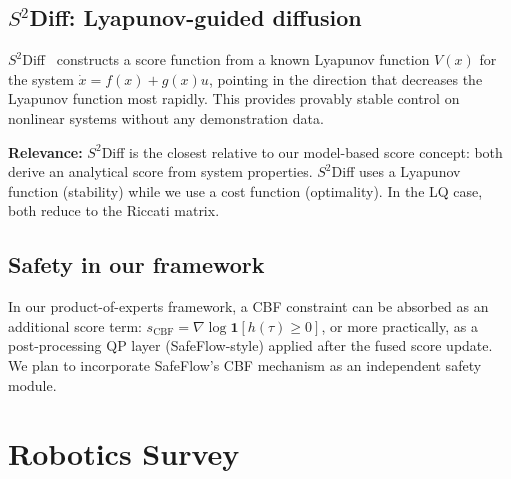 \documentclass[11pt,letterpaper]{article}
\theoremstyle{plain}
\theoremstyle{definition}
\theoremstyle{remark}
\newcommand{\grad}{\nabla}
\begin{document}
\subsection{$S^2$Diff: Lyapunov-guided diffusion}

$S^2$Diff~\citep{s2diff} constructs a score function from a known
Lyapunov function $V(x)$ for the system $\dot x=f(x)+g(x)u$, pointing
in the direction that decreases the Lyapunov function most rapidly.
This provides provably stable control on nonlinear systems without any
demonstration data.

\textbf{Relevance:} $S^2$Diff is the closest relative to our
model-based score concept: both derive an analytical score from system
properties.  $S^2$Diff uses a Lyapunov function (stability) while we
use a cost function (optimality).  In the LQ case, both reduce to the
Riccati matrix.

\subsection{Safety in our framework}

In our product-of-experts framework, a CBF constraint can be absorbed
as an additional score term:
$s_\text{CBF}=\grad\log\mathbf{1}[h(\tau)\ge 0]$, or more practically,
as a post-processing QP layer (SafeFlow-style) applied after the fused
score update.  We plan to incorporate SafeFlow's CBF mechanism as an
independent safety module.

\section{Robotics Survey}\label{sec:survey}
\end{document}
